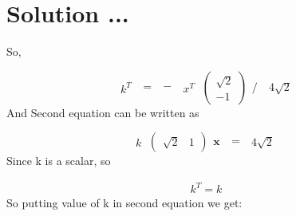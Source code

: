 \documentclass{beamer}
\begin{document}
\section{Solution ...}
So, 


\[\begin{matrix}
\textbf{$k^T$}
\end{matrix} 
\
%
\begin{matrix}
=
\end{matrix} 
\
%
\begin{matrix}
-
\end{matrix} 
\
%
\begin{matrix}
\textbf{$x^T$}
\end{matrix} 
\
%
\left( \begin{array}{cc}
\sqrt{2} \\
 -1
\end{array} \right)
% 
\begin{matrix}
 /
\end{matrix} 
\
%
 \begin{matrix}
4\sqrt{2}
\end{matrix} 
\
\]
And Second equation can be written as 

\[  \begin{matrix}
k
\end{matrix} 
\
%
\left( \begin{array}{cc}
\sqrt{2} & 1
\end{array} \right)
%
 \begin{matrix}
\textbf{x}
\end{matrix} 
\
%
 \begin{matrix}
=
\end{matrix} 
\
%
 \begin{matrix}
4\sqrt{2}\
\end{matrix} 
\
\]
Since k is a scalar, so

\[ \begin{matrix}
\textbf{$k^T =  k$}
\end{matrix} 
\
\]
So putting value of k in second equation we get:
\end{document}
